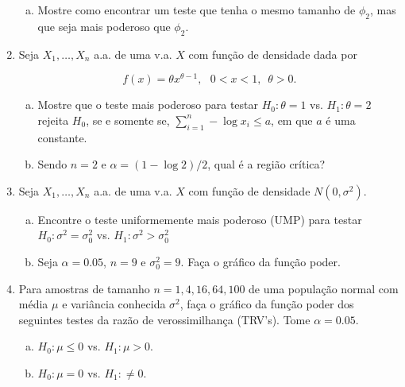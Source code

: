 \documentclass[10pt,brazil,addpoints]{exam}
\begin{document}
\begin{enumerate}[1.]
\begin{enumerate}[a)]
\item Mostre como encontrar um teste que tenha o mesmo tamanho de $\phi_2$, mas que seja mais poderoso que $\phi_2$.
\end{enumerate}


\medskip
\item %
 Seja $X_1,\ldots,X_n$  a.a. de uma v.a. $X$ com função de densidade dada por

\[f(x)=\theta x^{\theta-1},\,\,\,\,0<x<1,\,\,\,\theta> 0.\]

\begin{enumerate}[a)]
\item  Mostre que o teste mais poderoso para testar  $H_0:\theta =1$ vs. $H_1:\theta = 2$ rejeita $H_0$, se e somente se, $\sum_{i=1}^n -\log x_i\leq a$, em que $a$ é uma constante.

\item Sendo $n=2$ e $\alpha=(1-\log 2)/2$, qual é a região crítica?
\end{enumerate}



\medskip
\item%
 Seja $X_1,\ldots,X_n$ a.a. de uma v.a. $X$ com função de densidade $N(0,\sigma^2)$.

\begin{enumerate}[a)]
\item Encontre o teste uniformemente mais poderoso (UMP) para testar $H_0:\sigma^2 =\sigma_0^2 $ vs. $H_1:\sigma^2 > \sigma_0^2 $

\item Seja $\alpha = 0.05$, $n = 9$ e $\sigma_0^2=9$.
 Faça o gráfico da função poder.
\end{enumerate}




\medskip
\item %
Para amostras de tamanho $n=1,4,16,64,100$ de uma população normal com média $\mu$ e variância conhecida $\sigma^2$, faça o gráfico da função poder dos seguintes testes da razão de verossimilhança (TRV's). Tome $\alpha=0.05$.
\begin{enumerate}[a)]
\item $H_0:\mu\leq 0$  vs. $H_1:\mu>0$.
\item $H_0:\mu= 0$  vs. $H_1:\neq 0$.
\end{enumerate}









\end{enumerate}
\end{document}
